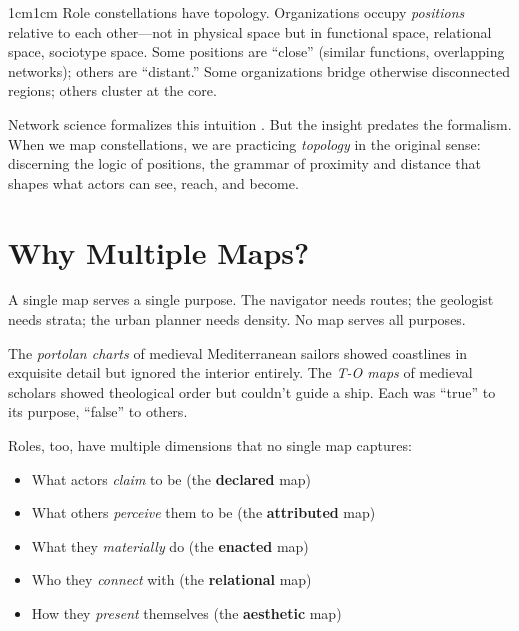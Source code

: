 \documentclass[../main.tex]{subfiles}
\begin{document}
\begin{adjustwidth}{1cm}{1cm}
Role constellations have topology. Organizations occupy \textit{positions} relative to each other---not in physical space but in functional space, relational space, sociotype space. Some positions are ``close'' (similar functions, overlapping networks); others are ``distant.'' Some organizations bridge otherwise disconnected regions; others cluster at the core.

Network science formalizes this intuition \cite{newman2010networks,borgatti2009network}. But the insight predates the formalism. When we map constellations, we are practicing \textit{topology} in the original sense: discerning the logic of positions, the grammar of proximity and distance that shapes what actors can see, reach, and become.

\vspace{0.8cm}

\section*{Why Multiple Maps?}

A single map serves a single purpose. The navigator needs routes; the geologist needs strata; the urban planner needs density. No map serves all purposes.

The \textit{portolan charts} of medieval Mediterranean sailors showed coastlines in exquisite detail but ignored the interior entirely. The \textit{T-O maps} of medieval scholars showed theological order but couldn't guide a ship. Each was ``true'' to its purpose, ``false'' to others.

Roles, too, have multiple dimensions that no single map captures:

\begin{itemize}[leftmargin=2em, itemsep=0.3em]
    \item What actors \textit{claim} to be (the \textbf{declared} map)
    \item What others \textit{perceive} them to be (the \textbf{attributed} map)
    \item What they \textit{materially} do (the \textbf{enacted} map)
    \item Who they \textit{connect} with (the \textbf{relational} map)
    \item How they \textit{present} themselves (the \textbf{aesthetic} map)
\end{itemize}


\end{adjustwidth}
\end{document}
